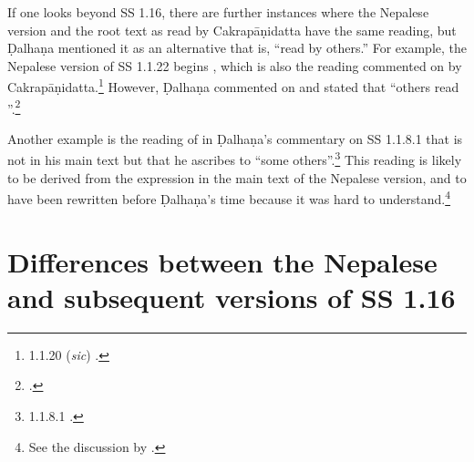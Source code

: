 If one looks beyond SS 1.16, there are further instances where the Nepalese version and
the root text as read by Cakrapāṇidatta have the same reading, but Ḍalhaṇa
mentioned it as an alternative that is, “read by others.” For example, the Nepalese
version of SS 1.1.22 begins , which is also
the reading commented on by Cakrapāṇidatta.\footnote{1.1.20 (\emph{sic})
    \citep[17]{acar-1939}.} However, Ḍalhaṇa commented on  and
    stated that “others read ”.\footnote{.}
        
Another example is the reading of  in Ḍalhaṇa's commentary
on SS 1.1.8.1 that is not in his main text but that he ascribes to “some
others”.\footnote{1.1.8.1 \citep[3]{vulgate}.} This reading is likely to be derived  from 
the 
expression  in the main text of the Nepalese version, and to 
have been rewritten before Ḍalhaṇa's time because it was hard to 
understand.\footnote{See the discussion by \citet[4--5]{birc-2021a}.}


\section{Differences between the Nepalese and subsequent versions of SS 
1.16}


